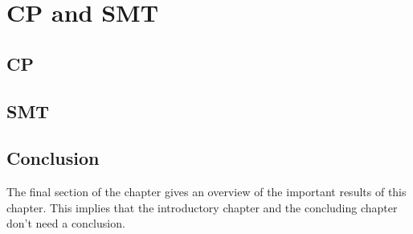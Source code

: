 \chapter{CP and SMT}
\label{cha:4}


\section{CP}

\section{SMT}


\section{Conclusion}
The final section of the chapter gives an overview of the important results
of this chapter. This implies that the introductory chapter and the
concluding chapter don't need a conclusion.

